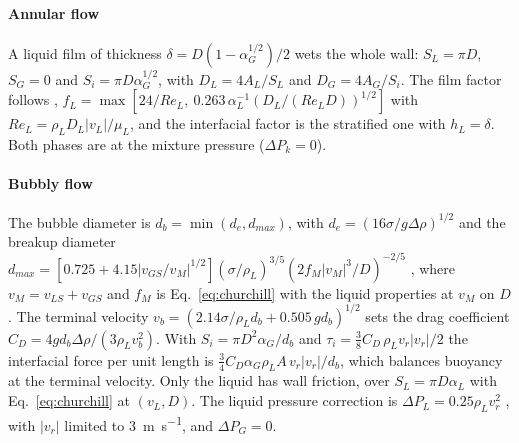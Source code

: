 \documentclass[a4paper,fleqn]{cas-sc}
\newcommand{\aG}{\alpha_G}
\newcommand{\aL}{\alpha_L}
\begin{document}
\paragraph{Annular flow} A liquid film of thickness $\delta = D(1 - \aG^{1/2})/2$ wets the whole wall: $S_L = \pi D$, $S_G = 0$ and $S_i = \pi D\aG^{1/2}$, with $D_L = 4A_L/S_L$ and $D_G = 4A_G/S_i$. The film factor follows \citet{kowalski1987}, $f_L = \max[24/Re_L,\ 0.263\,\aL^{-1}(D_L/(Re_L D))^{1/2}]$ with $Re_L = \rho_L D_L|v_L|/\mu_L$, and the interfacial factor is the stratified one with $h_L = \delta$. Both phases are at the mixture pressure ($\Delta P_k = 0$).

\paragraph{Bubbly flow} The bubble diameter is $d_b = \min(d_e, d_{max})$, with $d_e = (16\sigma/g\Delta\rho)^{1/2}$ and the breakup diameter $d_{max} = [0.725 + 4.15|v_{GS}/v_M|^{1/2}](\sigma/\rho_L)^{3/5}(2 f_M |v_M|^3/D)^{-2/5}$ \citep{hinze1955,calderbank1958}, where $v_M = v_{LS} + v_{GS}$ and $f_M$ is Eq.~\eqref{eq:churchill} with the liquid properties at $v_M$ on $D$. The terminal velocity $v_b = (2.14\sigma/\rho_L d_b + 0.505\,g d_b)^{1/2}$ \citep{mendelson1967,fan1990} sets the drag coefficient $C_D = 4 g d_b \Delta\rho/(3\rho_L v_b^2)$. With $S_i = \pi D^2\aG/d_b$ and $\tau_i = \tfrac38 C_D\,\rho_L v_r|v_r|/2$ the interfacial force per unit length is $\tfrac34 C_D \aG\rho_L A\,v_r|v_r|/d_b$, which balances buoyancy at the terminal velocity. Only the liquid has wall friction, over $S_L = \pi D\aL$ with Eq.~\eqref{eq:churchill} at $(v_L, D)$. The liquid pressure correction is $\Delta P_L = 0.25\rho_L v_r^2$ \citep{stuhmiller1977}, with $|v_r|$ limited to \SI{3}{\metre\per\second}, and $\Delta P_G = 0$.
\end{document}
